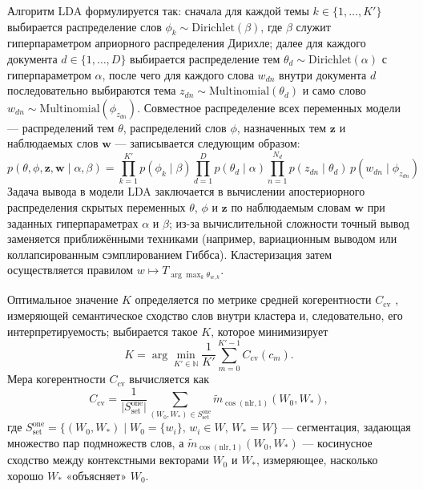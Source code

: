\documentclass[14pt,a4paper]{article}
\begin{document}
Алгоритм LDA формулируется так: сначала для каждой темы $k\in\{1,\ldots,K'\}$ выбирается распределение слов $\phi_k\sim\mathrm{Dirichlet}(\beta)$, где $\beta$ служит гиперпараметром априорного распределения Дирихле; далее для каждого документа $d\in\{1,\ldots,D\}$ выбирается распределение тем $\theta_d\sim\mathrm{Dirichlet}(\alpha)$ с гиперпараметром $\alpha$, после чего для каждого слова $w_{dn}$ внутри документа $d$ последовательно выбираются тема $z_{dn}\sim\mathrm{Multinomial}(\theta_d)$ и само слово $w_{dn}\sim\mathrm{Multinomial}(\phi_{z_{dn}})$. Совместное распределение всех переменных модели — распределений тем $\theta$, распределений слов $\phi$, назначенных тем $\mathbf z$ и наблюдаемых слов $\mathbf w$ — записывается следующим образом:
\begin{equation}
p(\theta, \phi, \mathbf{z}, \mathbf{w} \mid \alpha, \beta) = \prod_{k=1}^{K'} p(\phi_k \mid \beta) \prod_{d=1}^D p(\theta_d \mid \alpha) \prod_{n=1}^{N_d} p(z_{dn} \mid \theta_d)\, p(w_{dn} \mid \phi_{z_{dn}})
\end{equation}
Задача вывода в модели LDA заключается в вычислении апостериорного распределения скрытых переменных $\theta$, $\phi$ и $\mathbf z$ по наблюдаемым словам $\mathbf w$ при заданных гиперпараметрах $\alpha$ и $\beta$; из-за вычислительной сложности точный вывод заменяется приближёнными техниками (например, вариационным выводом или коллапсированным сэмплированием Гиббса). Кластеризация затем осуществляется правилом \(w\mapsto T_{\arg\max_{k}\theta_{w,k}}.\)

Оптимальное значение $K$ определяется по метрике средней когерентности $C_{\text{cv}}$ \cite{roder2015exploring}, измеряющей семантическое сходство слов внутри кластера и, следовательно, его интерпретируемость; выбирается такое $K$, которое минимизирует
\[
K=\arg\min_{K'\in\mathbb N}\frac{1}{K'}\sum_{m=0}^{K'-1}C_{\text{cv}}(c_m).
\]
Мера когерентности $C_{\text{cv}}$ вычисляется как
\[
C_{\text{cv}}=\frac{1}{\lvert S^{\text{one}}_{\text{set}}\rvert}\sum_{(W_0,W_*)\in S^{\text{one}}_{\text{set}}}\tilde m_{\cos(\mathrm{nlr},1)}(W_0,W_*),
\]
где $S^{\text{one}}_{\text{set}}=\{(W_0,W_*)\mid W_0=\{w_i\},\,w_i\in W,\,W_*=W\}$ — сегментация, задающая множество пар подмножеств слов, а $\tilde m_{\cos(\mathrm{nlr},1)}(W_0,W_*)$ — косинусное сходство между контекстными векторами $W_0$ и $W_*$, измеряющее, насколько хорошо $W_*$ «объясняет» $W_0$.
\end{document}
